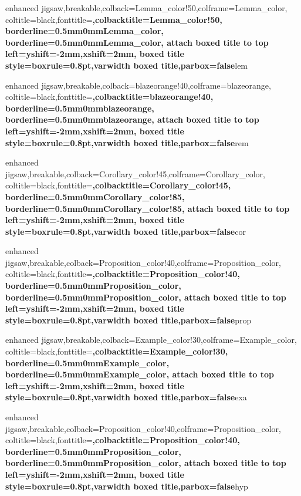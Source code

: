 {enhanced jigsaw,breakable,colback=Lemma_color!50,colframe=Lemma_color,
coltitle=black,fonttitle=\bfseries ,colbacktitle=Lemma_color!50,
borderline={0.5mm}{0mm}{Lemma_color},
borderline={0.5mm}{0mm}{Lemma_color},
attach boxed title to top left={yshift=-2mm,xshift=2mm},
boxed title style={boxrule=0.8pt},varwidth boxed title,parbox=false}{lem}



{enhanced jigsaw,breakable,colback=blazeorange!40,colframe=blazeorange,
coltitle=black,fonttitle=\bfseries ,colbacktitle=blazeorange!40,
borderline={0.5mm}{0mm}{blazeorange},
borderline={0.5mm}{0mm}{blazeorange},
attach boxed title to top left={yshift=-2mm,xshift=2mm},
boxed title style={boxrule=0.8pt},varwidth boxed title,parbox=false}{rem}



{enhanced jigsaw,breakable,colback=Corollary_color!45,colframe=Corollary_color,
coltitle=black,fonttitle=\bfseries ,colbacktitle=Corollary_color!45,
borderline={0.5mm}{0mm}{Corollary_color!85},
borderline={0.5mm}{0mm}{Corollary_color!85},
attach boxed title to top left={yshift=-2mm,xshift=2mm},
boxed title style={boxrule=0.8pt},varwidth boxed title,parbox=false}{cor}



{enhanced jigsaw,breakable,colback=Proposition_color!40,colframe=Proposition_color,
coltitle=black,fonttitle=\bfseries ,colbacktitle=Proposition_color!40,
borderline={0.5mm}{0mm}{Proposition_color},
borderline={0.5mm}{0mm}{Proposition_color},
attach boxed title to top left={yshift=-2mm,xshift=2mm},
boxed title style={boxrule=0.8pt},varwidth boxed title,parbox=false}{prop}



{enhanced jigsaw,breakable,colback=Example_color!30,colframe=Example_color,
coltitle=black,fonttitle=\bfseries ,colbacktitle=Example_color!30,
borderline={0.5mm}{0mm}{Example_color},
borderline={0.5mm}{0mm}{Example_color},
attach boxed title to top left={yshift=-2mm,xshift=2mm},
boxed title style={boxrule=0.8pt},varwidth boxed title,parbox=false}{exa}


{enhanced jigsaw,breakable,colback=Proposition_color!40,colframe=Proposition_color,
coltitle=black,fonttitle=\bfseries ,colbacktitle=Proposition_color!40,
borderline={0.5mm}{0mm}{Proposition_color},
borderline={0.5mm}{0mm}{Proposition_color},
attach boxed title to top left={yshift=-2mm,xshift=2mm},
boxed title style={boxrule=0.8pt},varwidth boxed title,parbox=false}{hyp}

